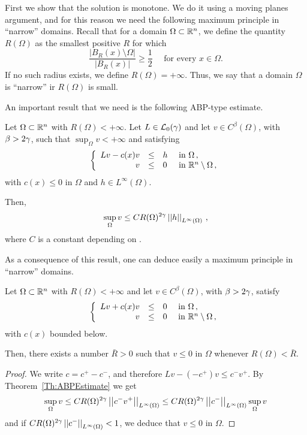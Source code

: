 First we show that the solution is monotone. We do it using a moving planes argument, and for this reason we need the following maximum principle in ``narrow'' domains. Recall that for a domain $\Omega \subset \mathbb{R}^n$, we define the quantity $R(\Omega)$ as the smallest positive $R$ for which
$$
\dfrac{|B_R(x)\setminus \Omega|}{|B_R(x)|}\geq \dfrac{1}{2} \quad \text{ for every } x \in \Omega.
$$
If no such radius exists, we define $R(\Omega) = +\infty$. Thus, we say that a domain $\Omega$ is ``narrow'' ir $R(\Omega)$ is small.


An important result that we need is the following ABP-type estimate. 
\begin{theorem}
	\label{Th:ABPEstimate}
	Let $\Omega \subset \mathbb{R}^n$ with $R(\Omega) < +\infty$. Let $L \in \mathcal{L}_0(\gamma)$ and let $v\in C^{\beta}(\Omega)$, with $\beta > 2\gamma$, such that $\sup_{\Omega} v < +\infty$ and satisfying
	$$
	\left\{\begin{array}{rcll}
	Lv - c(x)v &\leq & h & \text{ in } \Omega\,, \\
	v & \leq & 0 & \text{ in } \mathbb{R}^n\setminus \Omega\,,
	\end{array} \right.
	$$
	with $c(x)\leq 0$ in $\Omega$ and $h\in L^\infty(\Omega)$.
	
	Then,
	$$
	\sup_\Omega v \leq C R(\Omega)^{2\gamma} \left | \left |{h} \right | \right |_{L^{\infty}(\Omega)}\,,
	$$
	where $C$ is a constant depending on .
\end{theorem}

As a consequence of this result, one can deduce easily a maximum principle in ``narrow'' domains.

\begin{corollary}
	\label{Cor:MaxPpleNarrowDomains}
	Let $\Omega \subset \mathbb{R}^n$ with $R(\Omega) < +\infty$ and let $v\in C^{\beta}(\Omega)$, with $\beta > 2\gamma$, satisfy
	$$
	\left\{\begin{array}{rcll}
	Lv + c(x)v &\leq & 0 & \text{ in } \Omega\,, \\
	v & \leq & 0 & \text{ in } \mathbb{R}^n\setminus \Omega\,,
	\end{array} \right.
	$$
	with $c(x)$ bounded below.
	
	Then, there exists a number $\bar{R} > 0$ such that $v \leq 0$ in $\Omega$ whenever $R(\Omega)< \bar{R}$.
	
\end{corollary}

\begin{proof}
	We write $c= c^+ - c^-$, and therefore $Lv -(-c^+)v \leq c^- v^+	$. By Theorem~\ref{Th:ABPEstimate} we get
	$$
	\sup_\Omega v \leq C R(\Omega)^{2\gamma} \left | \left |{c^- v^+} \right | \right |_{L^\infty(\Omega)} \leq C R(\Omega)^{2\gamma} \left | \left |{c^-} \right | \right |_{L^\infty(\Omega)} \sup_\Omega v 
	$$
	and if $C R(\Omega)^{2\gamma} \left | \left |{c^-} \right | \right |_{L^\infty(\Omega)}  <1 $, we deduce that $v\leq 0$ in $\Omega$.
\end{proof}

